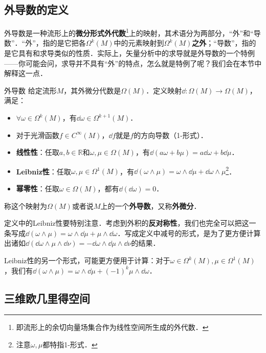 

\subsection{外导数的定义}

外导数是一种流形上的\textbf{微分形式外代数}\footnote{即流形上的余切向量场集合作为线性空间所生成的外代数．}上的映射，其术语分为两部分，“外”和“导数”．“外”，指的是它把各$\Omega^k(M)$中的元素映射到$\Omega^k(M)$\textbf{之外}；“导数”，指的是它具有和求导类似的性质．实际上，矢量分析中的求导就是外导数的一个特例——你可能会问，求导并不具有“外”的特点，怎么就是特例了呢？我们会在本节中解释这一点．

\begin{definition}{外导数}
给定流形$M$，其外微分代数是$\Omega (M)$．定义映射$\dd:\Omega (M)\rightarrow\Omega (M)$，满足：
\begin{itemize}
\item $\forall \omega\in\Omega^k(M)$，有$\dd \omega\in\Omega^{k+1}(M)$．
\item 对于光滑函数$f\in C^\infty(M)$，$\dd f$就是$f$的方向导数（1-形式）．
\item \textbf{线性性}：任取$a, b\in \mathbb{R}$和$\omega, \mu\in\Omega(M)$，有$\dd(a\omega+b\mu)=a\dd\omega+b\dd\mu$．
\item \textbf{Leibniz性}：任取$\omega, \mu\in\Omega^1(M)$，有$\dd(\omega\wedge\mu)=\omega\wedge\dd\mu+\dd\omega\wedge\mu$\footnote{注意$\omega, \mu$都特指1-形式．}．
\item \textbf{幂零性}：任取$\omega\in\Omega(M)$，都有$\dd(\dd\omega)=0$．
\end{itemize}
称这个映射为$\Omega (M)$或者说$M$上的一个\textbf{外导数}，又称\textbf{外微分}．
\end{definition}

定义中的Leibniz性要特别注意．考虑到外积的\textbf{反对称性}，我们也完全可以把这一条写成$\dd(\omega\wedge\mu)=\omega\wedge\dd\mu+\mu\wedge\dd\omega$．写成定义中减号的形式，是为了更方便计算出诸如$\dd(\dd\omega\wedge\mu\wedge\dd\nu)=-\dd\omega\wedge\dd\mu\wedge\dd\nu$的结果．

Leibniz性的另一个形式，可能更方便用于计算：对于$\omega\in\Omega^k(M), \mu\in\Omega^1(M)$，我们有$\dd(\omega\wedge\mu)=\omega\wedge\dd\mu+(-1)^k\mu\wedge\dd\omega$．

\subsection{三维欧几里得空间}

